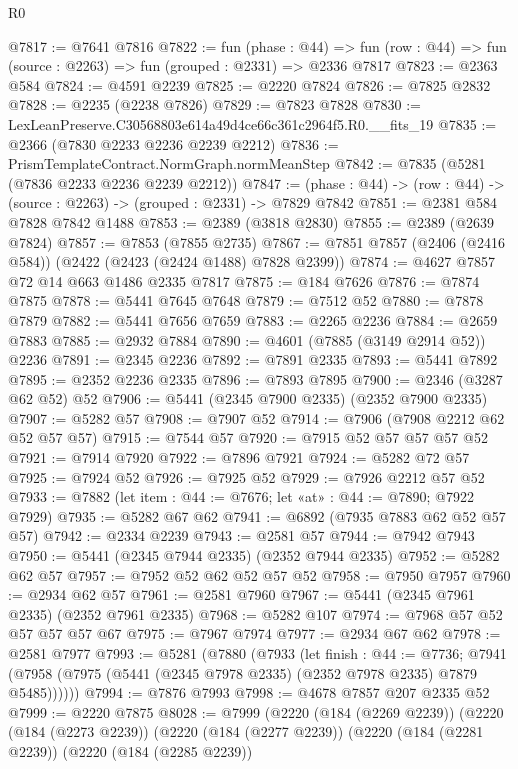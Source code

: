 \begin{lexlean}{R0}
\begin{coremodule}
@7817 := @7641 @7816
@7822 := fun (phase : @44) =>
  fun (row : @44) => fun (source : @2263) => fun (grouped : @2331) => @2336 @7817
@7823 := @2363 @584
@7824 := @4591 @2239
@7825 := @2220 @7824
@7826 := @7825 @2832
@7828 := @2235 (@2238 @7826)
@7829 := @7823 @7828
@7830 := LexLeanPreserve.C30568803e614a49d4ce66c361c2964f5.R0.__fits_19
@7835 := @2366 (@7830 @2233 @2236 @2239 @2212)
@7836 := PrismTemplateContract.NormGraph.normMeanStep
@7842 := @7835 (@5281 (@7836 @2233 @2236 @2239 @2212))
@7847 := (phase : @44) -> (row : @44) -> (source : @2263) -> (grouped : @2331) -> @7829 @7842
@7851 := @2381 @584 @7828 @7842 @1488
@7853 := @2389 (@3818 @2830)
@7855 := @2389 (@2639 @7824)
@7857 := @7853 (@7855 @2735)
@7867 := @7851 @7857 (@2406 (@2416 @584)) (@2422 (@2423 (@2424 @1488) @7828 @2399))
@7874 := @4627 @7857 @72 @14 @663 @1486 @2335 @7817
@7875 := @184 @7626
@7876 := @7874 @7875
@7878 := @5441 @7645 @7648
@7879 := @7512 @52
@7880 := @7878 @7879
@7882 := @5441 @7656 @7659
@7883 := @2265 @2236
@7884 := @2659 @7883
@7885 := @2932 @7884
@7890 := @4601 (@7885 (@3149 @2914 @52)) @2236
@7891 := @2345 @2236
@7892 := @7891 @2335
@7893 := @5441 @7892
@7895 := @2352 @2236 @2335
@7896 := @7893 @7895
@7900 := @2346 (@3287 @62 @52) @52
@7906 := @5441 (@2345 @7900 @2335) (@2352 @7900 @2335)
@7907 := @5282 @57
@7908 := @7907 @52
@7914 := @7906 (@7908 @2212 @62 @52 @57 @57)
@7915 := @7544 @57
@7920 := @7915 @52 @57 @57 @57 @52
@7921 := @7914 @7920
@7922 := @7896 @7921
@7924 := @5282 @72 @57
@7925 := @7924 @52
@7926 := @7925 @52
@7929 := @7926 @2212 @57 @52
@7933 := @7882 (let item : @44 := @7676; let «at» : @44 := @7890; @7922 @7929)
@7935 := @5282 @67 @62
@7941 := @6892 (@7935 @7883 @62 @52 @57 @57)
@7942 := @2334 @2239
@7943 := @2581 @57
@7944 := @7942 @7943
@7950 := @5441 (@2345 @7944 @2335) (@2352 @7944 @2335)
@7952 := @5282 @62 @57
@7957 := @7952 @52 @62 @52 @57 @52
@7958 := @7950 @7957
@7960 := @2934 @62 @57
@7961 := @2581 @7960
@7967 := @5441 (@2345 @7961 @2335) (@2352 @7961 @2335)
@7968 := @5282 @107
@7974 := @7968 @57 @52 @57 @57 @57 @67
@7975 := @7967 @7974
@7977 := @2934 @67 @62
@7978 := @2581 @7977
@7993 := @5281
    (@7880
      (@7933
        (let finish : @44 := @7736;
        @7941 (@7958 (@7975 (@5441 (@2345 @7978 @2335) (@2352 @7978 @2335) @7879 @5485))))))
@7994 := @7876 @7993
@7998 := @4678 @7857 @207 @2335 @52
@7999 := @2220 @7875
@8028 := @7999
    (@2220
      (@184 (@2269 @2239))
      (@2220
        (@184 (@2273 @2239))
        (@2220
          (@184 (@2277 @2239))
          (@2220
            (@184 (@2281 @2239))
            (@2220
              (@184 (@2285 @2239))

\end{coremodule}
\end{lexlean}
